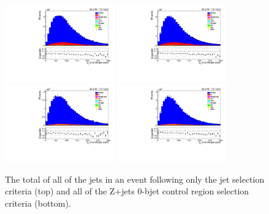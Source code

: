 \begin{figure}[ht]
\centering
\includegraphics[width=0.42\textwidth]{figs/background-estimation/plots/unblinded/DY_control_old_prompt_ee_DYamcatnlo/totalJetPt_SingleTop_jetSel_ee.pdf}
\includegraphics[width=0.42\textwidth]{figs/background-estimation/plots/unblinded/DY_control_old_prompt_mumu_DYamcatnlo/totalJetPt_SingleTop_jetSel_mumu.pdf}
\\
\includegraphics[width=0.42\textwidth]{figs/background-estimation/plots/unblinded/DY_control_old_prompt_ee_DYamcatnlo/totalJetPt_SingleTop_wMass_ee.pdf}
\includegraphics[width=0.42\textwidth]{figs/background-estimation/plots/unblinded/DY_control_old_prompt_mumu_DYamcatnlo/totalJetPt_SingleTop_wMass_mumu.pdf}
\caption{
The total \pT of all of the jets in an event following only the jet selection criteria (top) and all of the Z+jets 0-bjet control region selection criteria (bottom).
}
\label{fig:App_CR_NLO_totalJetPt}
\end{figure}

